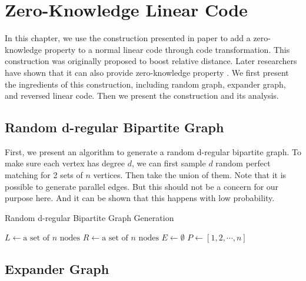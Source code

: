 \chapter{Zero-Knowledge Linear Code}

In this chapter, we use the construction presented in paper \cite{10.1145/2554797.2554815} to add a zero-knowledge property to a normal linear code through code transformation. This construction was originally proposed to boost relative distance. Later researchers have shown that it can also provide zero-knowledge property \cite{BCL22}. We first present the ingredients of this construction, including random graph, expander graph, and reversed linear code. Then we present the construction and its analysis.

\section{Random d-regular Bipartite Graph}
\label{sec:randomgraph}
First, we present an algorithm to generate a random d-regular bipartite graph. To make sure each vertex has degree $d$, we can first sample $d$ random perfect matching for 2 sets of $n$ vertices. Then take the union of them. Note that it is possible to generate parallel edges. But this should not be a concern for our purpose here. And it can be shown that this happens with low probability.

{}
\begin{algorithm}[hbt!]
\caption{Random d-regular Bipartite Graph Generation}
\label{alg:randomgarph}

$L \gets \text{a set of } n \text{ nodes}$\;
$R \gets \text{a set of } n \text{ nodes}$\;
$E \gets \emptyset$\;
$P \gets [1, 2, \cdots , n]$\;
\end{algorithm}


\section{Expander Graph}


